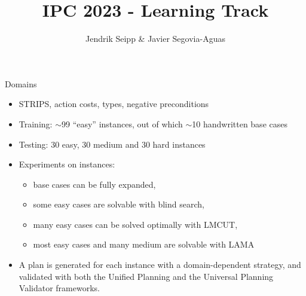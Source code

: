 \documentclass[aspectratio=169,xcolor=dvipsnames]{beamer}
\title[short title]{IPC 2023 - Learning Track} %
\author[Allauthors] {Jendrik Seipp \& Javier Segovia-Aguas}
\date{} %
\begin{document}
\begin{frame}
    \titlepage

\end{frame}

\begin{frame}{Domains}
    \begin{itemize}
        \item STRIPS, action costs, types, negative preconditions
        \item Training: $\sim$99 ``easy'' instances, out of which $\sim$10 handwritten base cases
        \item Testing: 30 easy, 30 medium and 30 hard instances
        \item Experiments on instances:
        \begin{itemize}
            \item base cases can be fully expanded,
            \item some easy cases are solvable with blind search,
            \item many easy cases can be solved optimally with LMCUT,
            \item most easy cases and many medium are solvable with LAMA
        \end{itemize}
        \item A plan is generated for each instance with a domain-dependent strategy, and validated with both the Unified Planning and the Universal Planning Validator frameworks.
    \end{itemize}
\end{frame}
\end{document}
